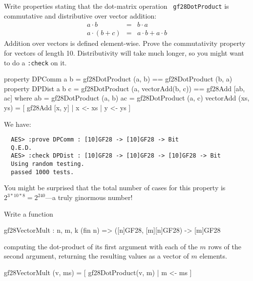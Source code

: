 
\begin{Exercise}\label{ex:aesmc:1}
  Write properties stating that the dot-matrix operation {\tt
    gf28DotProduct} is commutative and distributive over vector
  addition:
\begin{eqnarray*}
a \cdot b &=& b \cdot a \\
a \cdot (b + c) &=& a\cdot b + a\cdot b
\end{eqnarray*}
Addition over vectors is defined element-wise. Prove the commutativity
property for vectors of length 10.  Distributivity will take much
longer, so you might want to do a {\tt :check} on it.\indCmdCheck
{}
\end{Exercise}
\begin{Answer}
\begin{code}
  property DPComm a b =     gf28DotProduct (a, b) == gf28DotProduct (b, a)
  property DPDist a b c =   gf28DotProduct (a, vectorAdd(b, c)) ==
                            gf28Add [ab, ac]
     where   ab = gf28DotProduct (a, b)
             ac = gf28DotProduct (a, c)
             vectorAdd (xs, ys) = [ gf28Add [x, y] | x <- xs
                                                   | y <- ys
                                  ]
\end{code}
We have:
\begin{Verbatim}
  AES> :prove DPComm : [10]GF28 -> [10]GF28 -> Bit
  Q.E.D.
  AES> :check DPDist : [10]GF28 -> [10]GF28 -> [10]GF28 -> Bit
  Using random testing.
  passed 1000 tests.
\end{Verbatim}
You might be surprised that the total number of cases for this
property is $2^{3*10*8} = 2^{240}$---a truly ginormous number!
\end{Answer}

\begin{Exercise}\label{ex:aesmc:2}
Write a function
\begin{code}
  gf28VectorMult : {n, m, k} (fin n) => ([n]GF28, [m][n]GF28) ->
                                         [m]GF28
\end{code}
computing the dot-product of its first argument with each of the $m$
rows of the second argument, returning the resulting values as a
vector of $m$ elements.
\end{Exercise}
\begin{Answer}
\begin{code}
  gf28VectorMult (v, ms) = [ gf28DotProduct(v, m) | m <- ms ]
\end{code}
\end{Answer}


